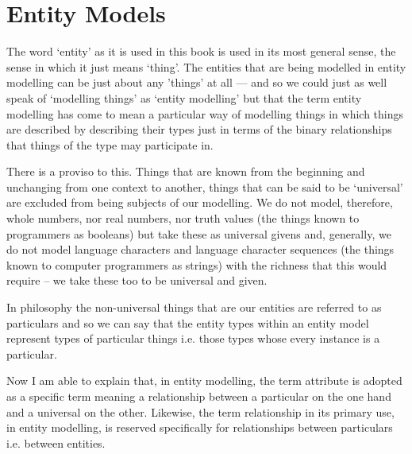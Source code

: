 

\section{Entity Models}

\mynote The word `entity' as it is used in this book is used in its most general sense,  the sense in which it just means `thing'. The entities that are being modelled in entity modelling can be just about any 'things' at all --- and so we could just as well speak of `modelling things' as `entity modelling' but that the term entity modelling
has come to mean a particular way of modelling things in which things are described by describing their types just in terms of the binary relationships that things of the type may participate in.

\mynote There is a proviso to this. 
Things that are known from the beginning and unchanging from one context to another, things that can be said to be `universal' are excluded from being subjects of our modelling. We do not model, therefore, whole numbers, nor real numbers, nor truth values (the things known to programmers as booleans) but take these as universal givens and, generally, we do not model language characters and language character sequences (the things known to computer programmers as strings) with the richness that this would require -- we take these too to be universal and given. 

\mynote In philosophy the non-universal things that are our entities are referred to as particulars and so we can say that the entity types within an entity model represent types of particular things i.e. those types whose every instance is a particular.  

\mynote Now I am able to explain that, in entity modelling, the term attribute is adopted as a specific term meaning a relationship between a particular on the one hand and a universal on the other. Likewise, the term relationship 
in its primary use, in entity modelling, is reserved specifically for relationships between particulars i.e. between entities. 

